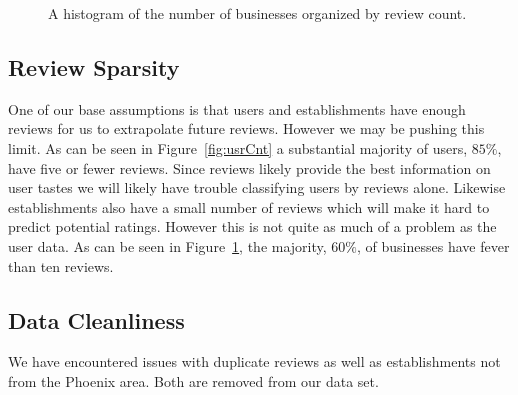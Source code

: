 \documentclass[10pt,twocolumn,letterpaper]{article}
\begin{document}
\begin{figure}[t]
\begin{center}
\end{center}
   \caption{A histogram of the number of businesses organized by review count.}
\label{fig:bizCnt}
\end{figure}

\subsection{Review Sparsity}
One of our base assumptions is that users and establishments have enough reviews for us to extrapolate future reviews. However we may be pushing this limit. As can be seen in Figure~\ref{fig:usrCnt} a substantial majority of users, $85\%$, have five or fewer reviews. Since reviews likely provide the best information on user tastes we will likely have trouble classifying users by reviews alone. Likewise establishments also have a small number of reviews which will make it hard to predict potential ratings. However this is not quite as much of a problem as the user data. As can be seen in Figure~\ref{fig:bizCnt}, the majority, $60\%$, of businesses have fever than ten reviews.

\subsection{Data Cleanliness}
We have encountered issues with duplicate reviews as well as establishments not from the Phoenix area. Both are removed from our data set.

\end{document}
